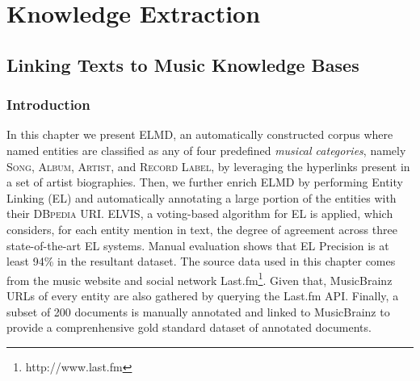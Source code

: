 \part{Knowledge Extraction}
\label{part:knowledge-acquisition}

\chapter{Linking Texts to Music Knowledge Bases}
\label{sec:background}


\section{Introduction}

In this chapter we present \textsc{ELMD}, an automatically constructed corpus where named entities are classified as any of four predefined \textit{musical categories}, namely \textsc{Song}, \textsc{Album}, \textsc{Artist}, and \textsc{Record Label}, by leveraging the hyperlinks present in a set of artist biographies. Then, we further enrich \textsc{ELMD} by performing Entity Linking (EL) and automatically annotating a large portion of the entities with their \textsc{DBpedia} URI. \textsc{ELVIS}, a voting-based algorithm for EL is applied, which considers, for each entity mention in text, the degree of agreement across three state-of-the-art EL systems. 
Manual evaluation shows that EL Precision is at least 94\% in the resultant dataset.
The source data used in this chapter comes from the music website and social network Last.fm\footnote{http://www.last.fm}. %
Given that, MusicBrainz URLs of every entity are also gathered by querying the Last.fm API.
Finally, a subset of 200 documents is manually annotated and linked to MusicBrainz to provide a comprenhensive gold standard dataset of annotated documents. 




